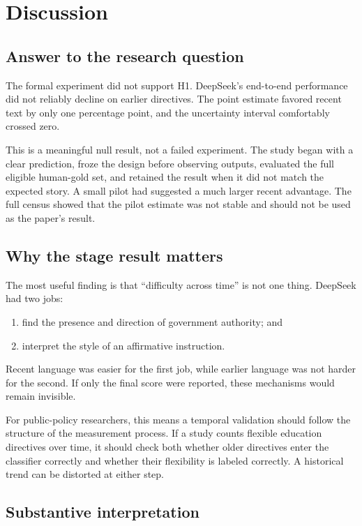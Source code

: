\documentclass[11pt]{article}
\begin{document}
\section{Discussion}

\subsection{Answer to the research question}

The formal experiment did not support H1. DeepSeek's end-to-end performance did not reliably decline on earlier directives. The point estimate favored recent text by only one percentage point, and the uncertainty interval comfortably crossed zero.

This is a meaningful null result, not a failed experiment. The study began with a clear prediction, froze the design before observing outputs, evaluated the full eligible human-gold set, and retained the result when it did not match the expected story. A small pilot had suggested a much larger recent advantage. The full census showed that the pilot estimate was not stable and should not be used as the paper's result.

\subsection{Why the stage result matters}

The most useful finding is that ``difficulty across time'' is not one thing. DeepSeek had two jobs:

\begin{enumerate}
    \item find the presence and direction of government authority; and
    \item interpret the style of an affirmative instruction.
\end{enumerate}

Recent language was easier for the first job, while earlier language was not harder for the second. If only the final score were reported, these mechanisms would remain invisible.

For public-policy researchers, this means a temporal validation should follow the structure of the measurement process. If a study counts flexible education directives over time, it should check both whether older directives enter the classifier correctly and whether their flexibility is labeled correctly. A historical trend can be distorted at either step.

\subsection{Substantive interpretation}
\end{document}
